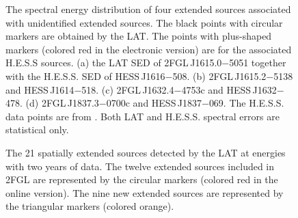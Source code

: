 \documentclass[12pt,preprint]{aastex}
\newif\ifcolorfigure
\newcommand{\gev}{\text{GeV}\xspace}
\newcommand{\tev}{\text{TeV}\xspace}
\begin{document}
\clearpage
\begin{figure}
    \ifcolorfigure
      \plotone{summary_plots/hess_seds_color.eps}
    \else
    \fi
    \caption{
    The spectral energy distribution of four extended
    sources associated with unidentified
    extended \tev sources.  The black points
    with circular markers are obtained by the LAT. The points with
    plus-shaped markers (colored red in the electronic version) are
    for the associated H.E.S.S sources.  (a) the
    LAT SED of 2FGL\,J1615.0$-$5051 together with the H.E.S.S. SED
    of HESS\,J1616$-$508. (b) 2FGL\,J1615.2$-$5138
    and HESS\,J1614$-$518. (c) 2FGL\,J1632.4$-$4753c
    and HESS\,J1632$-$478. (d) 2FGL\,J1837.3$-$0700c
    and HESS\,J1837$-$069. The H.E.S.S. data points are from
    \citep{hess_plane_survey}. Both LAT and H.E.S.S. spectral errors are
    statistical only.}
    \label{hess_seds}
  \end{figure}

\clearpage
  \begin{figure}
      \ifcolorfigure
      \plotone{summary_plots/allsky_extended_sources_color.eps}
      \else
      \fi
      \caption{The 21
      spatially extended sources detected by the LAT
      at \gev energies 
      with two years of data.  The twelve extended sources included in
      2FGL are represented by the circular markers (colored red in the online
      version).  The nine new extended sources are represented by
      the triangular markers (colored orange).}
\label{allsky_extended_sources}
  \end{figure}
\end{document}
